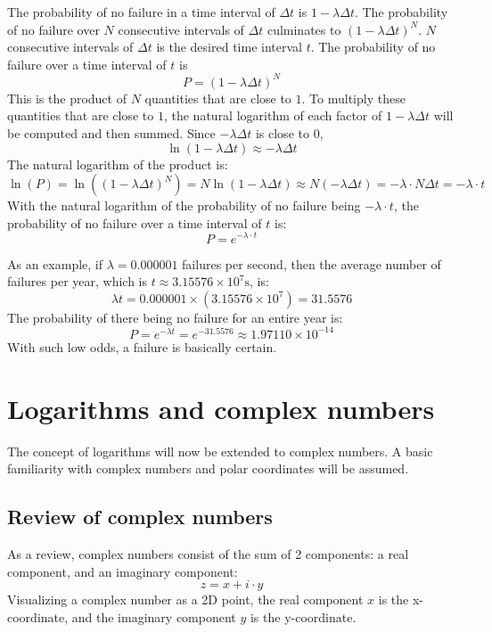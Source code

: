 \documentclass{article}
\begin{document}
\begin{description}
The probability of no failure in a time interval of \(\Delta t\) is \(1 - \lambda\Delta t\). The probability of no failure over \(N\) consecutive intervals of \(\Delta t\) culminates to \((1 - \lambda\Delta t)^N\). \(N\) consecutive intervals of \(\Delta t\) is the desired time interval \(t\). The probability of no failure over a time interval of \(t\) is 
\[P = (1 - \lambda\Delta t)^N\]  
This is the product of \(N\) quantities that are close to \(1\). To multiply these quantities that are close to \(1\), the natural logarithm of each factor of \(1 - \lambda\Delta t\) will be computed and then summed. Since \(-\lambda\Delta t\) is close to \(0\),
\[\ln(1 - \lambda\Delta t) \approx -\lambda \Delta t\]
The natural logarithm of the product is:
\[\ln(P) = \ln((1 - \lambda\Delta t)^N) = N\ln(1 - \lambda\Delta t) \approx N(-\lambda \Delta t) = -\lambda \cdot N\Delta t = -\lambda \cdot t\]
With the natural logarithm of the probability of no failure being \(-\lambda \cdot t\), the probability of no failure over a time interval of \(t\) is:
\[P = e^{-\lambda \cdot t}\] 

As an example, if \(\lambda = 0.000001\) failures per second, then the average number of failures per year, which is \(t \approx 3.15576 \times 10^7\text{s}\), is:  
\[\lambda t = 0.000001 \times (3.15576 \times 10^7) = 31.5576\]  
The probability of there being no failure for an entire year is: 
\[P = e^{-\lambda t} = e^{-31.5576} \approx 1.97110 \times 10^{-14}\]
With such low odds, a failure is basically certain. 


\end{description}




\section*{Logarithms and complex numbers}

The concept of logarithms will now be extended to complex numbers. A basic familiarity with complex numbers and polar coordinates will be assumed.

\subsection*{Review of complex numbers}

As a review, complex numbers consist of the sum of 2 components: a real component, and an imaginary component: 
\[z = x + i \cdot y\]
Visualizing a complex number as a 2D point, the real component \(x\) is the x-coordinate, and the imaginary component \(y\) is the y-coordinate. 
\end{document}
